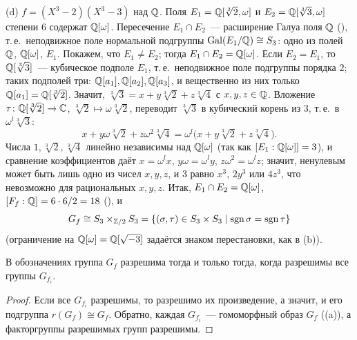 \begin{example}[3.27g]
(d) $f=(X^3-2)(X^3-3)$ над $\mathbb Q$. Поля $E_1=\mathbb Q[\sqrt[3]2,\omega]$ и $E_2=\mathbb Q[\sqrt[3]3,\omega]$ степени $6$ содержат $\mathbb Q[\omega]$.
Пересечение $E_1\cap E_2$~--- расширение Галуа поля $\mathbb Q$ (), т.\,е.\ неподвижное поле нормальной подгруппы
$\operatorname{Gal}(E_1/\mathbb Q)\cong S_3$: одно из полей $\mathbb Q$, $\mathbb Q[\omega]$, $E_1$. Покажем, что $E_1\ne E_2$; тогда $E_1\cap E_2=\mathbb Q[\omega]$. Если
$E_2=E_1$, то $\mathbb Q[\sqrt[3]3]$~--- кубическое подполе $E_1$, т.\,е.\ неподвижное поле подгруппы порядка $2$; таких подполей
три: $\mathbb Q[a_1],\mathbb Q[a_2],\mathbb Q[a_3]$, и вещественно из них только $\mathbb Q[a_1]=\mathbb Q[\sqrt[3]2]$. Значит, $\sqrt[3]3=x+y\sqrt[3]2+z\sqrt[3]4$
с $x,y,z\in\mathbb Q$. Вложение $\tau\colon\mathbb Q[\sqrt[3]2]\to\mathbb C$, $\sqrt[3]2\mapsto\omega\sqrt[3]2$, переводит $\sqrt[3]3$ в кубический
корень из $3$, т.\,е.\ в $\omega^l\sqrt[3]3$:
\[
x+y\omega\sqrt[3]2+z\omega^2\sqrt[3]4=\omega^l\bigl(x+y\sqrt[3]2+z\sqrt[3]4\bigr).
\]
Числа $1,\sqrt[3]2,\sqrt[3]4$ линейно независимы над $\mathbb Q[\omega]$ (так как $[E_1:\mathbb Q[\omega]]=3$), и сравнение
коэффициентов даёт $x=\omega^lx$, $y\omega=\omega^ly$, $z\omega^2=\omega^lz$; значит, ненулевым может быть лишь одно из
чисел $x,y,z$, и $3$ равно $x^3$, $2y^3$ или $4z^3$, что невозможно для рациональных $x,y,z$. Итак, $E_1\cap E_2=\mathbb Q[\omega]$,
$[F_f:\mathbb Q]=6\cdot6/2=18$ (), и
\[
G_f\cong S_3\times_{\mathbb Z/2}S_3=\{(\sigma,\tau)\in S_3\times S_3\mid\operatorname{sgn}\sigma=\operatorname{sgn}\tau\}
\]
(ограничение на $\mathbb Q[\omega]=\mathbb Q[\sqrt{-3}]$ задаётся знаком перестановки, как в (b)).
\end{example}

\begin{corollary}[3.27h]
В обозначениях  группа $G_f$ разрешима тогда и только тогда, когда разрешимы все группы $G_{f_i}$.
\end{corollary}

\begin{proof}
Если все $G_{f_i}$ разрешимы, то разрешимо их произведение, а значит, и его подгруппа $r(G_f)\cong G_f$. Обратно, каждая
$G_{f_i}$~--- гомоморфный образ $G_f$ ((a)), а факторгруппы разрешимых групп разрешимы.
\end{proof}
